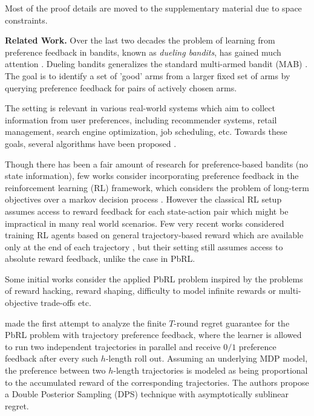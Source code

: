 Most of the proof details are moved to the supplementary material due to space constraints.
\fi 

\textbf{Related Work.} Over the last two decades the problem of learning from preference feedback in bandits, known as \textit{dueling bandits}, has gained much attention \citep{Yue+12,Zoghi+14RCS,Zoghi+15}. Dueling bandits  generalizes the standard multi-armed bandit (MAB) \citep{Auer+02}. The goal is to identify a set of 'good' arms from a larger fixed set of arms by querying preference feedback for pairs of actively chosen arms.

\cite{Yue+09,BTM,RDB,GS21,SG18} The setting is relevant in various real-world systems which aim to collect information from user preferences, including recommender systems, retail management, search engine optimization, job scheduling, etc. Towards these goals, several algorithms have been proposed \citep{Ailon+14,Zoghi+14RUCB,Komiyama+15,Adv_DB,SGrank18,SGwin18}.

Though there has been a fair amount of research for preference-based bandits (no state information), few works consider incorporating preference feedback in the reinforcement learning (RL) framework, which considers the problem of long-term objectives over a markov decision process \citep{singh02,ng06,talebi18,ortner20, zhang19,zanette19}. However the classical RL setup assumes access to reward feedback for each state-action pair which might be impractical in many real world scenarios. Few very recent works considered  training RL agents based on general trajectory-based reward which are available only at the end of each trajectory \citep{Efroni21,chatterji21}, but their setting still assumes access to absolute reward feedback, unlike the case in PbRL. 

Some initial works consider the applied PbRL problem inspired by the problems of reward hacking,  reward shaping,  difficulty to model infinite rewards or  multi-objective trade-offs \citep{busa14,wirth16,wirth17,nipsPRL17} etc. 

\cite{sui19} made the first attempt to analyze the finite $T$-round regret guarantee for the PbRL problem with trajectory preference feedback, where the learner is allowed to run two independent trajectories in parallel and receive $0/1$ preference feedback after every such $h$-length roll out. Assuming an underlying MDP model, the preference between two $h$-length trajectories is modeled as being proportional to the accumulated reward of the corresponding trajectories. The authors propose a Double Posterior Sampling (DPS) technique with asymptotically sublinear regret. 

